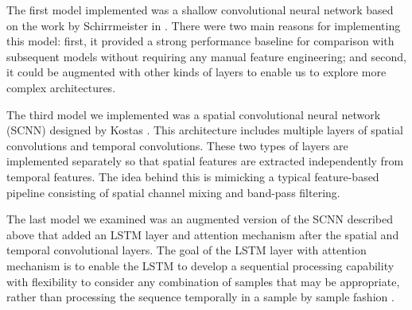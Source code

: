 \documentclass[10pt,twocolumn,letterpaper]{article}
\begin{document}
The first model implemented was a shallow convolutional neural network
based on the work by Schirrmeister \etal in \cite{DBLP}. There were two main
reasons for implementing this model: first, it provided a strong performance
baseline for comparison with subsequent models without requiring any manual
feature engineering; and second, it could be augmented with other kinds of
layers to enable us to explore more complex architectures.


The third model we implemented was a spatial convolutional neural network
(SCNN) designed by Kostas \etal \cite{kostas2019machine}. This architecture
includes multiple layers of spatial convolutions and temporal convolutions.
These two types of layers are implemented separately so that spatial features
are extracted independently from temporal features. The idea behind this is
mimicking a typical feature-based pipeline consisting of spatial channel mixing
and band-pass filtering.

The last model we examined was an augmented version of the SCNN described above
that added an LSTM layer and attention mechanism after the spatial and temporal
convolutional layers. The goal of the LSTM layer with attention mechanism is to
enable the LSTM to develop a sequential processing capability with flexibility
to consider any combination of samples that may be appropriate, rather than
processing the sequence temporally in a sample by sample fashion
\cite{kostas2019machine}.


\end{document}
